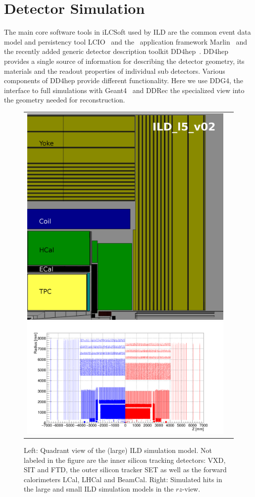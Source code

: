 \section{\label{sec:det-sim} Detector Simulation}

The main core software tools in iLCSoft used by ILD are the common event data model and persistency tool LCIO~\cite{Gaede:2003ip}
and the \CPP\ application framework Marlin~\cite{Gaede:2006pj} and the recently added generic detector description toolkit
DD4hep~\cite{Frank:2014zya,Frank:2015ivo}. DD4hep provides a single source of information for describing the detector geometry, its
materials and the readout properties of individual sub detectors. Various components of DD4hep provide different functionality.
Here we use DDG4, the interface to full simulations with Geant4~\cite{Agostinelli:2002hh} and DDRec the specialized view into the
geometry needed for reconstruction.
%
\begin{figure}[b!]
\begin{tabular}{cc}
\includegraphics[width=0.45\hsize]{Modelling/fig/ILD_l5_v02_sideview_gimp_2.jpg}
\includegraphics[width=0.55\hsize]{Modelling/fig/hits_rz_small_large_ILD.png}
\caption{\label{fig:sim_model_quad}Left: Quadrant view of the (large) ILD simulation model. Not labeled in the figure are the inner
  silicon tracking detectors: VXD, SIT and FTD, the outer silicon tracker SET as well as the forward calorimeters LCal, LHCal and BeamCal.
  Right: Simulated hits in the large and small ILD simulation models in the $rz$-view.
}
\end{tabular}
\end{figure}


